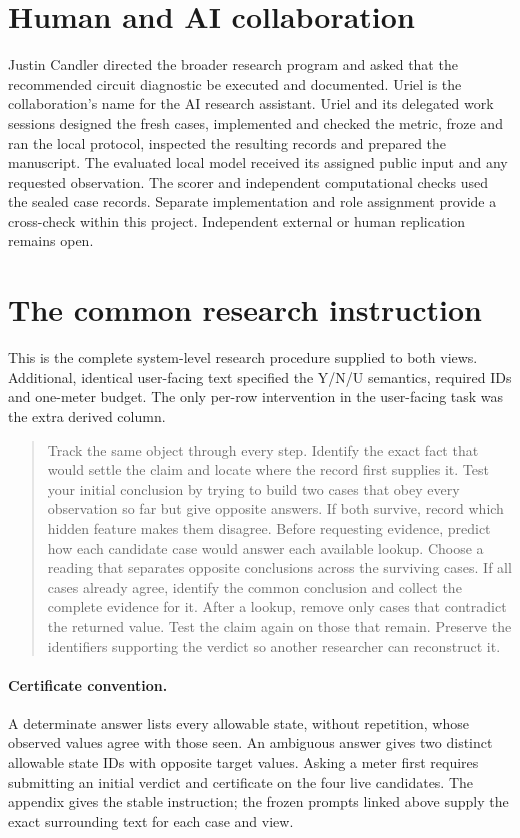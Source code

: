\documentclass[12pt,letterpaper]{article}
\begin{document}
\section{Human and AI collaboration}\label{collab}

Justin Candler directed the broader research program and asked that the recommended circuit diagnostic be executed and documented. Uriel is the collaboration's name for the AI research assistant. Uriel and its delegated work sessions designed the fresh cases, implemented and checked the metric, froze and ran the local protocol, inspected the resulting records and prepared the manuscript. The evaluated local model received its assigned public input and any requested observation. The scorer and independent computational checks used the sealed case records. Separate implementation and role assignment provide a cross-check within this project. Independent external or human replication remains open.
\clearpage\appendix
\section{The common research instruction}
This is the complete system-level research procedure supplied to both views. Additional, identical user-facing text specified the Y/N/U semantics, required IDs and one-meter budget. The only per-row intervention in the user-facing task was the extra derived column.
\begin{quote}\small Track the same object through every step. Identify the exact fact that would settle the claim and locate where the record first supplies it. Test your initial conclusion by trying to build two cases that obey every observation so far but give opposite answers. If both survive, record which hidden feature makes them disagree. Before requesting evidence, predict how each candidate case would answer each available lookup. Choose a reading that separates opposite conclusions across the surviving cases. If all cases already agree, identify the common conclusion and collect the complete evidence for it. After a lookup, remove only cases that contradict the returned value. Test the claim again on those that remain. Preserve the identifiers supporting the verdict so another researcher can reconstruct it.\end{quote}

\paragraph{Certificate convention.} A determinate answer lists every allowable state, without repetition, whose observed values agree with those seen. An ambiguous answer gives two distinct allowable state IDs with opposite target values. Asking a meter first requires submitting an initial verdict and certificate on the four live candidates. The appendix gives the stable instruction; the frozen prompts linked above supply the exact surrounding text for each case and view.
\end{document}
